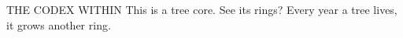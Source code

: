 THE CODEX WITHIN
This is a tree core. See its rings? Every year a tree lives, it grows another ring.
